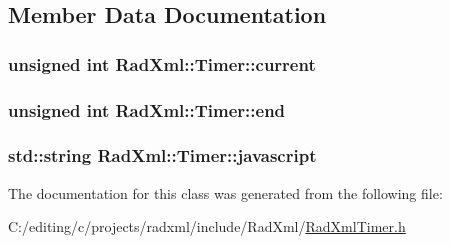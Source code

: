 \subsection{Member Data Documentation}
\hypertarget{class_rad_xml_1_1_timer_a902e643027564680c48b4f00f70fe4a5}{
\subsubsection[{current}]{\setlength{\rightskip}{0pt plus 5cm}unsigned int Rad\-Xml\-::\-Timer\-::current\hspace{0.3cm}{\ttfamily [protected]}}}\label{class_rad_xml_1_1_timer_a902e643027564680c48b4f00f70fe4a5}
\hypertarget{class_rad_xml_1_1_timer_aeab13030e3212ed7bd713ad5c97db44a}{
\subsubsection[{end}]{\setlength{\rightskip}{0pt plus 5cm}unsigned int Rad\-Xml\-::\-Timer\-::end\hspace{0.3cm}{\ttfamily [protected]}}}\label{class_rad_xml_1_1_timer_aeab13030e3212ed7bd713ad5c97db44a}
\hypertarget{class_rad_xml_1_1_timer_a238ff53c489a84c319c737b9dc12ce6a}{
\subsubsection[{javascript}]{\setlength{\rightskip}{0pt plus 5cm}std\-::string Rad\-Xml\-::\-Timer\-::javascript\hspace{0.3cm}{\ttfamily [protected]}}}\label{class_rad_xml_1_1_timer_a238ff53c489a84c319c737b9dc12ce6a}


The documentation for this class was generated from the following file\-:\begin{DoxyCompactItemize}
\item 
C\-:/editing/c/projects/radxml/include/\-Rad\-Xml/\hyperlink{_rad_xml_timer_8h}{Rad\-Xml\-Timer.\-h}\end{DoxyCompactItemize}

